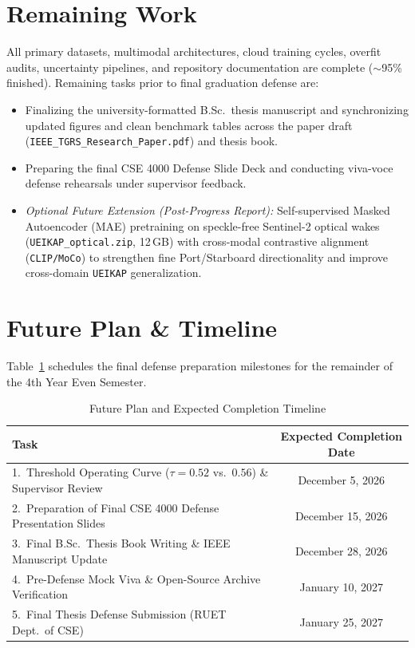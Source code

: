 \documentclass[11pt,a4paper]{article}
\begin{document}
\section{Remaining Work}

All primary datasets, multimodal architectures, cloud training cycles, overfit audits, uncertainty pipelines, and repository documentation are complete ($\sim$95\% finished). Remaining tasks prior to final graduation defense are:
\begin{itemize}[leftmargin=1.5em]
    \item Finalizing the university-formatted B.Sc.\ thesis manuscript and synchronizing updated figures and clean benchmark tables across the paper draft (\texttt{IEEE\_TGRS\_Research\_Paper.pdf}) and thesis book.
    \item Preparing the final CSE 4000 Defense Slide Deck and conducting viva-voce defense rehearsals under supervisor feedback.
    \item \textit{Optional Future Extension (Post-Progress Report):} Self-supervised Masked Autoencoder (MAE) pretraining on speckle-free Sentinel-2 optical wakes (\texttt{UEIKAP\_optical.zip}, 12\,GB) with cross-modal contrastive alignment (\texttt{CLIP/MoCo}) to strengthen fine Port/Starboard directionality and improve cross-domain \texttt{UEIKAP} generalization.
\end{itemize}

\section{Future Plan \& Timeline}

Table~\ref{tab:timeline} schedules the final defense preparation milestones for the remainder of the 4th Year Even Semester.

\begin{table}[H]
\centering
\caption{Future Plan and Expected Completion Timeline}
\label{tab:timeline}
\begin{tabular}{@{}lc@{}}
\toprule
\textbf{Task} & \textbf{Expected Completion Date} \\ \midrule
1.\ Threshold Operating Curve ($\tau=0.52$ vs.\ $0.56$) \& Supervisor Review & December 5, 2026 \\
2.\ Preparation of Final CSE 4000 Defense Presentation Slides & December 15, 2026 \\
3.\ Final B.Sc.\ Thesis Book Writing \& IEEE Manuscript Update & December 28, 2026 \\
4.\ Pre-Defense Mock Viva \& Open-Source Archive Verification & January 10, 2027 \\
5.\ Final Thesis Defense Submission (RUET Dept.\ of CSE) & January 25, 2027 \\ \bottomrule
\end{tabular}
\end{table}
\end{document}
